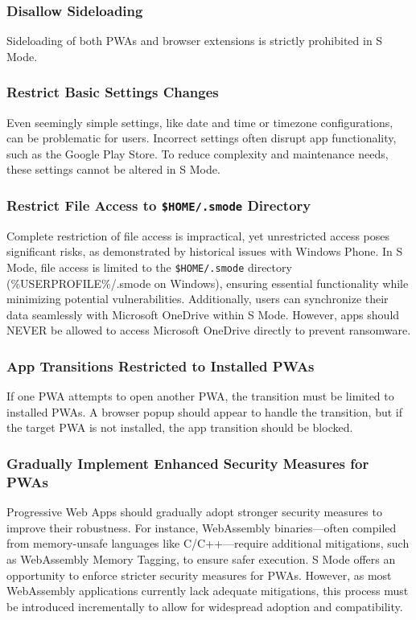 \subsubsection{Disallow Sideloading}

Sideloading of both PWAs and browser extensions is strictly prohibited in S Mode.

\subsubsection{Restrict Basic Settings Changes}

Even seemingly simple settings, like date and time or timezone configurations, can be problematic for users. Incorrect settings often disrupt app functionality, such as the Google Play Store. To reduce complexity and maintenance needs, these settings cannot be altered in S Mode.

\subsubsection{Restrict File Access to \texttt{\$HOME/.smode} Directory}

Complete restriction of file access is impractical, yet unrestricted access poses significant risks, as demonstrated by historical issues with Windows Phone. In S Mode, file access is limited to the \texttt{\$HOME/.smode} directory (\%USERPROFILE\%/.smode on Windows), ensuring essential functionality while minimizing potential vulnerabilities. Additionally, users can synchronize their data seamlessly with Microsoft OneDrive within S Mode. However, apps should NEVER be allowed to access Microsoft OneDrive directly to prevent ransomware.

\subsubsection{App Transitions Restricted to Installed PWAs}

If one PWA attempts to open another PWA, the transition must be limited to installed PWAs. A browser popup should appear to handle the transition, but if the target PWA is not installed, the app transition should be blocked.

\subsubsection{Gradually Implement Enhanced Security Measures for PWAs}

Progressive Web Apps should gradually adopt stronger security measures to improve their robustness. For instance, WebAssembly binaries—often compiled from memory-unsafe languages like C/C++—require additional mitigations, such as WebAssembly Memory Tagging\cite{webassemblymemorytagging}, to ensure safer execution. S Mode offers an opportunity to enforce stricter security measures for PWAs. However, as most WebAssembly applications currently lack adequate mitigations, this process must be introduced incrementally to allow for widespread adoption and compatibility.

